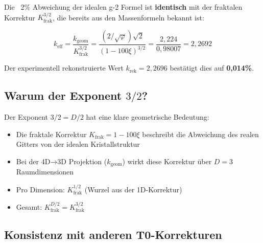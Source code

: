 	Die ~2\% Abweichung der idealen g-2 Formel ist \textbf{identisch} mit der fraktalen Korrektur $K_\text{frak}^{3/2}$, die bereits aus den Massenformeln bekannt ist:
	
	\begin{equation}
		\boxed{k_\text{eff} = \frac{k_\text{geom}}{K_\text{frak}^{3/2}} = \frac{(2/\sqrt{\varphi})\sqrt{2}}{(1-100\xi)^{3/2}} = \frac{2{,}224}{0{,}98007} = 2{,}2692}
	\end{equation}
	
	Der experimentell rekonstruierte Wert $k_\text{rek} = 2{,}2696$ bestätigt dies auf \textbf{0{,}014\%}.
	
	\subsection{Warum der Exponent $3/2$?}
	
	Der Exponent $3/2 = D/2$ hat eine klare geometrische Bedeutung:
	\begin{itemize}
		\item Die fraktale Korrektur $K_\text{frak} = 1 - 100\xi$ beschreibt die Abweichung des realen Gitters von der idealen Kristallstruktur
		\item Bei der 4D→3D Projektion ($k_\text{geom}$) wirkt diese Korrektur über $D = 3$ Raumdimensionen
		\item Pro Dimension: $K_\text{frak}^{1/2}$ (Wurzel aus der 1D-Korrektur)
		\item Gesamt: $K_\text{frak}^{D/2} = K_\text{frak}^{3/2}$
	\end{itemize}
	
	\subsection{Konsistenz mit anderen T0-Korrekturen}
	
	\begin{table}[h]
		\centering
		\caption{Universelle fraktale Korrektur mit kontextabhängigem Exponenten}
	\end{table}
	
